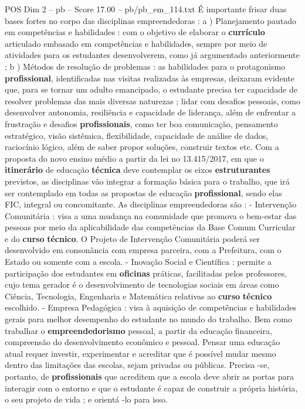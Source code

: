 \begin{textsample}{POS Dim 2 – pb – Score 17.00 – pb/pb\_em\_114.txt}
É importante frisar duas bases fortes no corpo das disciplinas empreendedoras : a ) Planejamento pautado em competências e habilidades : com o objetivo de elaborar o \textbf{currículo} articulado embasado em competências e habilidades, sempre por meio de atividades para os estudantes desenvolverem, como já argumentado anteriormente ; b ) Métodos de resolução de problemas : as habilidades para o protagonismo \textbf{profissional}, identificadas nas visitas realizadas às empresas, deixaram evidente que, para se tornar um adulto emancipado, o estudante precisa ter capacidade de resolver problemas das mais diversas naturezas ; lidar com desafios pessoais, como desenvolver autonomia, resiliência e capacidade de liderança, além de enfrentar a frustração e desafios \textbf{profissionais}, como ter boa comunicação, pensamento estratégico, visão sistêmica, flexibilidade, capacidade de análise de dados, raciocínio lógico, além de saber propor soluções, construir textos etc.
Com a proposta do novo ensino médio a partir da lei no 13.415/2017, em que o \textbf{itinerário} de educação \textbf{técnica} deve contemplar os eixos \textbf{estruturantes} previstos, as disciplinas vão integrar a formação básica para o trabalho, que irá ser contemplado em todas as propostas de educação \textbf{profissional}, sendo elas FIC, integral ou concomitante.
As disciplinas empreendedoras são : - Intervenção Comunitária : visa a uma mudança na comunidade que promova o bem-estar das pessoas por meio da aplicabilidade das competências da Base Comum Curricular e do \textbf{curso} \textbf{técnico}.
O Projeto de Intervenção Comunitária poderá ser desenvolvido em consonância com empresa parceira, com a Prefeitura, com o Estado ou somente com a escola. - Inovação Social e Científica : permite a participação dos estudantes em \textbf{oficinas} práticas, facilitadas pelos professores, cujo tema gerador é o desenvolvimento de tecnologias sociais em áreas como Ciência, Tecnologia, Engenharia e Matemática relativas ao \textbf{curso} \textbf{técnico} escolhido. - Empresa Pedagógica : visa à aquisição de competências e habilidades gerais para melhor desempenho do estudante no mundo do trabalho.
Bem como trabalhar o \textbf{empreendedorismo} pessoal, a partir da educação financeira, compreensão do desenvolvimento econômico e pessoal.
Pensar uma educação atual requer investir, experimentar e acreditar que é possível mudar mesmo dentro das limitações das escolas, sejam privadas ou públicas.
Precisa -se, portanto, de \textbf{profissionais} que acreditem que a escola deve abrir as portas para interagir com o entorno e que o estudante é capaz de construir a própria história, o seu projeto de vida ; e orientá -lo para isso.

\end{textsample}
